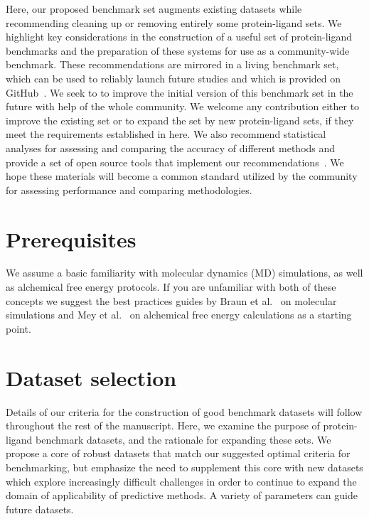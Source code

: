 \documentclass[9pt,bestpractices]{livecoms}
\begin{document}
Here, our proposed benchmark set augments existing datasets while recommending cleaning up or removing entirely some protein-ligand sets. We highlight key considerations in the construction of a useful set of protein-ligand benchmarks and the preparation of these systems for use as a community-wide benchmark. These recommendations are mirrored in a living benchmark set, which can be used to reliably launch future studies and which is provided on GitHub~\cite{_openforcefield_2020}. We seek to to improve the initial version of this benchmark set in the future with help of the whole community. We welcome any contribution either to improve the existing set or to expand the set by new protein-ligand sets, if they meet the requirements established in here. 
%
We also recommend statistical analyses for assessing and comparing the accuracy of different methods and provide a set of open source tools that implement our recommendations~\cite{github_openforcefield_arsenic_2020}. 
%
We hope these materials will become a common standard utilized by the community for assessing performance and comparing methodologies.  


\section{Prerequisites}
We assume a basic familiarity with molecular dynamics (MD) simulations, as well as alchemical free energy protocols. 
If you are unfamiliar with both of these concepts we suggest the best practices guides by Braun et al.~\cite{braunBestPracticesFoundations2019} on molecular simulations and Mey et al.~\cite{meyBestPracticesAlchemical2020} on alchemical free energy calculations as a starting point. 


\section{Dataset selection}
\label{sec:dataset}

Details of our criteria for the construction of good benchmark datasets will follow throughout the rest of the manuscript. 
Here, we examine the purpose of protein-ligand benchmark datasets, and the rationale for expanding these sets.
We propose a core of robust datasets that match our suggested optimal criteria for benchmarking, but emphasize the need to supplement this core with new datasets which explore increasingly difficult challenges in order to continue to expand the domain of applicability of predictive methods. 
A variety of parameters can guide future datasets.
\end{document}
